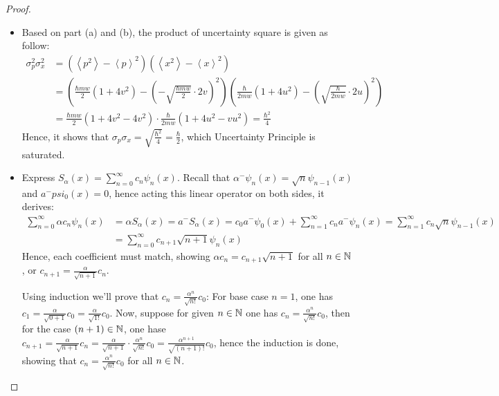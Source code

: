 \documentclass{article}
\begin{document}
\begin{proof}
\begin{itemize}
        \item[(c)] Based on part (a) and (b), the product of uncertainty square is given as follow:
        \begin{align}
            \sigma_p^2\sigma_x^2&=(\left<p^2\right>-\left<p\right>^2)(\left<x^2\right>-\left<x\right>^2)\\
            &= \left(\frac{\hbar mw}{2}(1+4v^2)-\left(-\sqrt{\frac{\hbar mw}{2}}\cdot 2v\right)^2\right)\left(\frac{\hbar}{2mw}(1+4u^2)-\left(\sqrt{\frac{\hbar}{2mw}}\cdot 2u\right)^2\right)\\
            &= \frac{\hbar mw}{2}(1+4v^2-4v^2)\cdot\frac{\hbar}{2mw}(1+4u^2-vu^2)=\frac{\hbar^2}{4}
        \end{align}
        Hence, it shows that $\sigma_p\sigma_x = \sqrt{\frac{\hbar^2}{4}}=\frac{\hbar}{2}$, which Uncertainty Principle is saturated.

        \hfil

        \item[(d)] Express $S_\alpha(x)=\sum_{n=0}^{\infty}c_n\psi_n(x)$. Recall that $\alpha^- \psi_n(x)=\sqrt{n}\psi_{n-1}(x)$ and $a^-psi_0(x)=0$, hence acting this linear operator on both sides, it derives:
        \begin{align}
            \sum_{n=0}^{\infty}\alpha c_n\psi_n(x)&=\alpha S_\alpha(x)= a^-S_\alpha(x)=c_0 a^-\psi_0(x)+\sum_{n=1}^{\infty}c_n a^-\psi_n(x) = \sum_{n=1}^{\infty}c_n\sqrt{n}\psi_{n-1}(x)\\
            &= \sum_{n=0}^{\infty}c_{n+1}\sqrt{n+1}\psi_n(x)
        \end{align}
        Hence, each coefficient must match, showing $\alpha c_n=c_{n+1}\sqrt{n+1}$ for all $n\in\mathbb{N}$, or $c_{n+1}=\frac{\alpha}{\sqrt{n+1}}c_n$.

        Using induction we'll prove that $c_n=\frac{\alpha^n}{\sqrt{n!}}c_0$: For base case $n=1$, one has $c_1=\frac{\alpha}{\sqrt{0+1}}c_0 = \frac{\alpha}{\sqrt{1!}}c_0$. Now, suppose for given $n\in\mathbb{N}$ one has $c_n=\frac{\alpha^n}{\sqrt{n!}}c_0$, then for the case $(n+1)\in\mathbb{N}$, one hase $c_{n+1}=\frac{\alpha}{\sqrt{n+1}}c_n = \frac{\alpha}{\sqrt{n+1}}\cdot\frac{\alpha^n}{\sqrt{n!}}c_0=\frac{\alpha^{n+1}}{\sqrt{(n+1)!}}c_0$, hence the induction is done, showing that $c_n=\frac{\alpha^n}{\sqrt{n!}}c_0$ for all $n\in\mathbb{N}$.

        \hfil


\end{itemize}
\end{proof}
\end{document}
